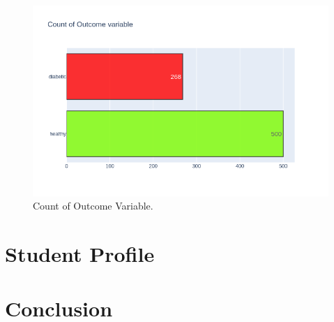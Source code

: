 \documentclass[12pt]{article}
\begin{document}
\begin{figure}[ht]
\centering
\includegraphics[width=1\textwidth]{newplot.png}
\caption{Count of Outcome Variable.}
\end{figure}
\clearpage
\newpage
\section{Student Profile}

\clearpage
\newpage
\section{Conclusion}
\newpage


\nocite{*}
\end{document}

